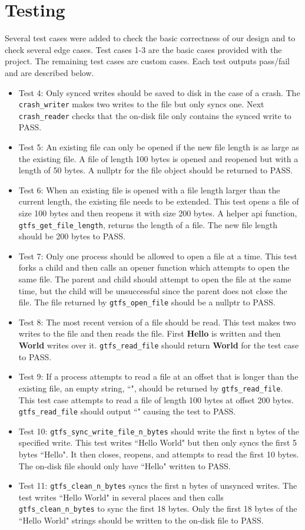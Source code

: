 \documentclass{article}
\begin{document}
\section*{Testing}
Several test cases were added to check the basic correctness of our design and to check several edge cases. Test cases 1-3 are the basic cases provided with the project. The remaining test cases are custom cases. Each test outputs pass/fail and are described below.
\begin{itemize}
    \item Test 4: Only synced writes should be saved to disk in the case of a crash. The \texttt{crash\_writer} makes two writes to the file but only syncs one. Next \texttt{crash\_reader} checks that the on-disk file only contains the synced write to PASS.
    \item Test 5: An existing file can only be opened if the new file length is as large as the existing file. A file of length 100 bytes is opened and reopened but with a length of 50 bytes. A nullptr for the file object should be returned to PASS.
    \item Test 6: When an existing file is opened with a file length larger than the current length, the existing file needs to be extended. This test opens a file of size 100 bytes and then reopens it with size 200 bytes. A helper api function, \texttt{gtfs\_get\_file\_length}, returns the length of a file. The new file length should be 200 bytes to PASS.
    \item Test 7: Only one process should be allowed to open a file at a time. This test forks a child and then calls an opener function which attempts to open the same file. The parent and child should attempt to open the file at the same time, but the child will be unsuccessful since the parent does not close the file. The file returned by \texttt{gtfs\_open\_file} should be a nullptr to PASS.
    \item Test 8: The most recent version of a file should be read. This test makes two writes to the file and then reads the file. First \textbf{Hello} is written and then \textbf{World} writes over it. \texttt{gtfs\_read\_file} should return \textbf{World} for the test case to PASS.
    \item Test 9: If a process attempts to read a file at an offset that is longer than the existing file, an empty string, ``", should be returned by \texttt{gtfs\_read\_file}. This test case attempts to read a file of length 100 bytes at offset 200 bytes. \texttt{gtfs\_read\_file} should output ``" causing the test to PASS.
    \item Test 10: \texttt{gtfs\_sync\_write\_file\_n\_bytes} should write the first n bytes of the specified write. This test writes ``Hello World" but then only syncs the first 5 bytes ``Hello". It then closes, reopens, and attempts to read the first 10 bytes. The on-disk file should only have ``Hello" written to PASS.
    \item Test 11: \texttt{gtfs\_clean\_n\_bytes} syncs the first n bytes of unsynced writes. The test writes ``Hello World" in several places and then calls \texttt{gtfs\_clean\_n\_bytes} to sync the first 18 bytes. Only the first 18 bytes of the ``Hello World" strings should be written to the on-disk file to PASS.
\end{itemize}
\end{document}
